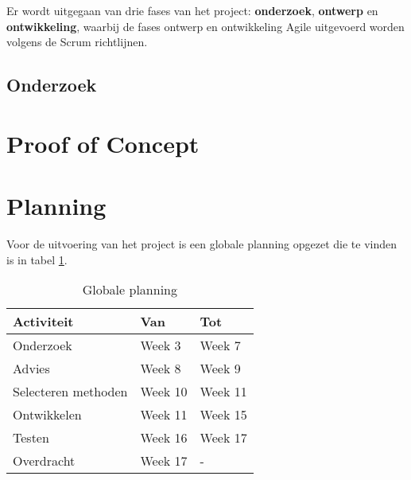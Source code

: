 Er wordt uitgegaan van drie fases van het project: \textbf{onderzoek}, \textbf{ontwerp} en \textbf{ontwikkeling}, waarbij de fases ontwerp en ontwikkeling Agile uitgevoerd worden volgens de Scrum richtlijnen.

\subsection{Onderzoek}






\newpage
\section{Proof of Concept}

\clearpage
\section{Planning}
Voor de uitvoering van het project is een globale planning opgezet die te vinden is in tabel \ref{planning}.

\begin{table}[ht]
  \begin{tabular}{|p{6cm}|p{4cm}|p{4cm}|}
    \hline
    \textbf{Activiteit} & \textbf{Van} & \textbf{Tot} \\
    \hline
    Onderzoek & Week 3 & Week 7 \\
    \hline
    Advies & Week 8 & Week 9 \\
    \hline
    Selecteren methoden & Week 10 & Week 11 \\
    \hline
    Ontwikkelen & Week 11 & Week 15 \\
    \hline
    Testen & Week 16 & Week 17 \\
    \hline
    Overdracht & Week 17 & - \\
    \hline
  \end{tabular}
  \caption{Globale planning}
  \label{planning}
\end{table}

